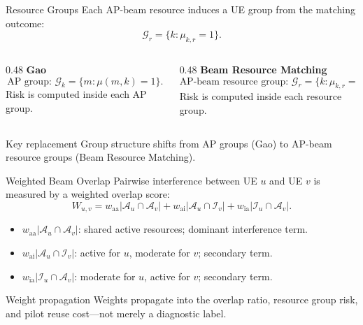 \documentclass[10pt,aspectratio=169]{beamer}
\newcommand{\BRM}{Beam Resource Matching}
\newcommand{\waa}{w_{\mathrm{aa}}}
\newcommand{\wai}{w_{\mathrm{ai}}}
\newcommand{\wia}{w_{\mathrm{ia}}}
\newenvironment{tightitemize}{%
    \begin{itemize}
        \setlength{\itemsep}{2pt}
        \setlength{\parskip}{0pt}
        \setlength{\parsep}{0pt}
}{%
    \end{itemize}
}
\begin{document}
\begin{frame}{Resource Groups}
    \small
    Each AP-beam resource induces a UE group from the matching outcome:
    \[
        \mathcal{G}_r=\{k:\mu_{k,r}=1\}.
    \]
    
    \vspace{0.5em}
    \begin{columns}[T,onlytextwidth]
        \begin{column}{0.48\textwidth}
            \textbf{Gao}
            \[
                \text{AP group: }
                \mathcal{G}_k=\{m:\mu(m,k)=1\}.
            \]
            Risk is computed inside each AP group.
        \end{column}
        \begin{column}{0.48\textwidth}
            \textbf{\BRM{}}
            \[
                \text{AP-beam resource group: }
                \mathcal{G}_r=\{k:\mu_{k,r}=1\}.
            \]
            Risk is computed inside each resource group.
        \end{column}
    \end{columns}
    
    \vspace{0.7em}
    \begin{block}{Key replacement}
        Group structure shifts from AP groups (Gao) to AP-beam resource groups (\BRM{}).
    \end{block}
\end{frame}

\begin{frame}{Weighted Beam Overlap}
    \small
    Pairwise interference between UE \(u\) and UE \(v\) is measured by a weighted overlap score:
    \[
        W_{u,v}
        =
        \waa|\mathcal{A}_u\cap\mathcal{A}_v|
        +
        \wai|\mathcal{A}_u\cap\mathcal{I}_v|
        +
        \wia|\mathcal{I}_u\cap\mathcal{A}_v|.
    \]
    
    \vspace{0.4em}
    \begin{tightitemize}
        \item \(\waa|\mathcal{A}_u\cap\mathcal{A}_v|\): shared active resources; dominant interference term.
        \item \(\wai|\mathcal{A}_u\cap\mathcal{I}_v|\): active for \(u\), moderate for \(v\); secondary term.
        \item \(\wia|\mathcal{I}_u\cap\mathcal{A}_v|\): moderate for \(u\), active for \(v\); secondary term.
    \end{tightitemize}
    
    \vspace{0.45em}
    \begin{block}{Weight propagation}
        Weights propagate into the overlap ratio, resource group risk, and pilot reuse cost---not merely a diagnostic label.
    \end{block}
\end{frame}
\end{document}
